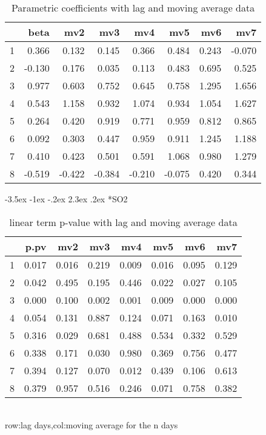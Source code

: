 \documentclass[a4paper, 12pt]{article}
\makeatletter
\def\large{\fontsize{14}{20}\selectfont}
\renewcommand\subsection{\@startsection {subsection}{1}{\z@}%
                                   {-3.5ex \@plus -1ex \@minus -.2ex}%
                                   {2.3ex \@plus.2ex}%
                                   {\centering\normalfont\large\bfseries}}
\makeatother
\begin{document}
\begin{table}[h]
\centering
\caption{Parametric coefficients with lag and moving average data}
\begin{tabular}{rrrrrrrr}
  \hline
 & beta & mv2 & mv3 & mv4 & mv5 & mv6 & mv7 \\
  \hline
1 & 0.366 & 0.132 & 0.145 & 0.366 & 0.484 & 0.243 & -0.070 \\
  2 & -0.130 & 0.176 & 0.035 & 0.113 & 0.483 & 0.695 & 0.525 \\
  3 & 0.977 & 0.603 & 0.752 & 0.645 & 0.758 & 1.295 & 1.656 \\
  4 & 0.543 & 1.158 & 0.932 & 1.074 & 0.934 & 1.054 & 1.627 \\
  5 & 0.264 & 0.420 & 0.919 & 0.771 & 0.959 & 0.812 & 0.865 \\
  6 & 0.092 & 0.303 & 0.447 & 0.959 & 0.911 & 1.245 & 1.188 \\
  7 & 0.410 & 0.423 & 0.501 & 0.591 & 1.068 & 0.980 & 1.279 \\
  8 & -0.519 & -0.422 & -0.384 & -0.210 & -0.075 & 0.420 & 0.344 \\
   \hline
\end{tabular}
\end{table}
\clearpage
\subsection*{SO2}
\begin{table}[h]
\centering
\caption{linear term p-value with lag and moving average data}
\begin{tabular}{rrrrrrrr}
  \hline
 & p.pv & mv2 & mv3 & mv4 & mv5 & mv6 & mv7 \\
  \hline
1 & 0.017 & 0.016 & 0.219 & 0.009 & 0.016 & 0.095 & 0.129 \\
  2 & 0.042 & 0.495 & 0.195 & 0.446 & 0.022 & 0.027 & 0.105 \\
  3 & 0.000 & 0.100 & 0.002 & 0.001 & 0.009 & 0.000 & 0.000 \\
  4 & 0.054 & 0.131 & 0.887 & 0.124 & 0.071 & 0.163 & 0.010 \\
  5 & 0.316 & 0.029 & 0.681 & 0.488 & 0.534 & 0.332 & 0.529 \\
  6 & 0.338 & 0.171 & 0.030 & 0.980 & 0.369 & 0.756 & 0.477 \\
  7 & 0.394 & 0.127 & 0.070 & 0.012 & 0.439 & 0.106 & 0.613 \\
  8 & 0.379 & 0.957 & 0.516 & 0.246 & 0.071 & 0.758 & 0.382 \\
   \hline
\end{tabular}
\\row:lag days,col:moving average for the n days
\end{table}
\end{document}
